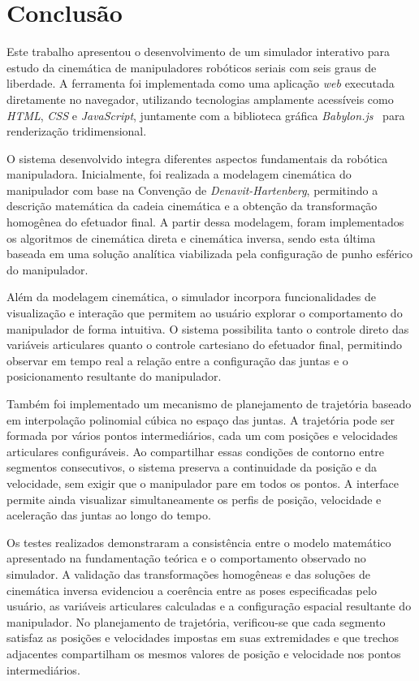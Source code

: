 \chapter{Conclusão}

Este trabalho apresentou o desenvolvimento de um simulador interativo para estudo da cinemática de manipuladores robóticos seriais com seis graus de liberdade. A ferramenta foi implementada como uma aplicação \textit{web} executada diretamente no navegador, utilizando tecnologias amplamente acessíveis como \textit{HTML}, \textit{CSS} e \textit{JavaScript}, juntamente com a biblioteca gráfica \textit{Babylon.js}~\cite{babylonjs} para renderização tridimensional.

O sistema desenvolvido integra diferentes aspectos fundamentais da robótica manipuladora. Inicialmente, foi realizada a modelagem cinemática do manipulador com base na Convenção de \textit{Denavit-Hartenberg}, permitindo a descrição matemática da cadeia cinemática e a obtenção da transformação homogênea do efetuador final. A partir dessa modelagem, foram implementados os algoritmos de cinemática direta e cinemática inversa, sendo esta última baseada em uma solução analítica viabilizada pela configuração de punho esférico do manipulador.

Além da modelagem cinemática, o simulador incorpora funcionalidades de visualização e interação que permitem ao usuário explorar o comportamento do manipulador de forma intuitiva. O sistema possibilita tanto o controle direto das variáveis articulares quanto o controle cartesiano do efetuador final, permitindo observar em tempo real a relação entre a configuração das juntas e o posicionamento resultante do manipulador.

Também foi implementado um mecanismo de planejamento de trajetória baseado em interpolação polinomial cúbica no espaço das juntas. A trajetória pode ser formada por vários pontos intermediários, cada um com posições e velocidades articulares configuráveis. Ao compartilhar essas condições de contorno entre segmentos consecutivos, o sistema preserva a continuidade da posição e da velocidade, sem exigir que o manipulador pare em todos os pontos. A interface permite ainda visualizar simultaneamente os perfis de posição, velocidade e aceleração das juntas ao longo do tempo.

Os testes realizados demonstraram a consistência entre o modelo matemático apresentado na fundamentação teórica e o comportamento observado no simulador. A validação das transformações homogêneas e das soluções de cinemática inversa evidenciou a coerência entre as poses especificadas pelo usuário, as variáveis articulares calculadas e a configuração espacial resultante do manipulador. No planejamento de trajetória, verificou-se que cada segmento satisfaz as posições e velocidades impostas em suas extremidades e que trechos adjacentes compartilham os mesmos valores de posição e velocidade nos pontos intermediários.

